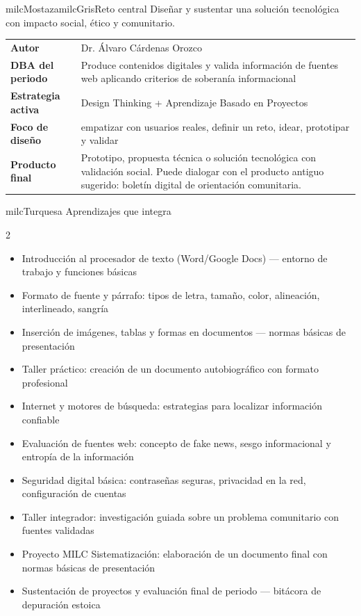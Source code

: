\documentclass[11pt,letterpaper]{article}
\begin{document}
\begin{softbox}{milcMostaza}{milcGris}{Reto central}
Diseñar y sustentar una solución tecnológica con impacto social, ético y comunitario.
\end{softbox}

\begin{tabularx}{\textwidth}{>{\bfseries}p{3.4cm}X}
\rowcolor{milcMagenta!12}Autor & Dr. Álvaro Cárdenas Orozco\\
DBA del periodo & Produce contenidos digitales y valida información de fuentes web aplicando criterios de soberanía informacional\\
Estrategia activa & Design Thinking + Aprendizaje Basado en Proyectos\\
Foco de diseño & empatizar con usuarios reales, definir un reto, idear, prototipar y validar\\
Producto final & Prototipo, propuesta técnica o solución tecnológica con validación social. Puede dialogar con el producto antiguo sugerido: boletín digital de orientación comunitaria.\\
\end{tabularx}

\begin{titlebox}{milcTurquesa}
Aprendizajes que integra
\end{titlebox}
\begin{multicols}{2}
\begin{itemize}[leftmargin=*]
\item Introducción al procesador de texto (Word/Google Docs) — entorno de trabajo y funciones básicas
\item Formato de fuente y párrafo: tipos de letra, tamaño, color, alineación, interlineado, sangría
\item Inserción de imágenes, tablas y formas en documentos — normas básicas de presentación
\item Taller práctico: creación de un documento autobiográfico con formato profesional
\item Internet y motores de búsqueda: estrategias para localizar información confiable
\item Evaluación de fuentes web: concepto de fake news, sesgo informacional y entropía de la información
\item Seguridad digital básica: contraseñas seguras, privacidad en la red, configuración de cuentas
\item Taller integrador: investigación guiada sobre un problema comunitario con fuentes validadas
\item Proyecto MILC Sistematización: elaboración de un documento final con normas básicas de presentación
\item Sustentación de proyectos y evaluación final de periodo — bitácora de depuración estoica
\end{itemize}
\end{multicols}
\end{document}
